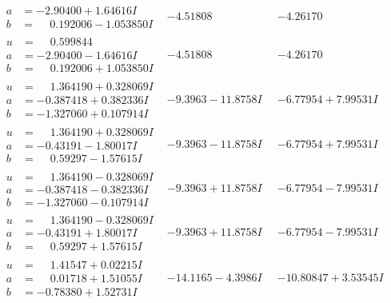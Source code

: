 \documentclass[1p]{elsarticle_modified}
\theoremstyle{definition}
\begin{document}
$$\begin{array}{c|c|c}
\begin{aligned}
a &= -2.90400 + 1.64616 I \\
b &= \phantom{-}0.192006 - 1.053850 I\end{aligned}
 & -4.51808\phantom{ +0.000000I} & -4.26170\phantom{ +0.000000I} \\ \hline\begin{aligned}
u &= \phantom{-}0.599844\phantom{ +0.000000I} \\
a &= -2.90400 - 1.64616 I \\
b &= \phantom{-}0.192006 + 1.053850 I\end{aligned}
 & -4.51808\phantom{ +0.000000I} & -4.26170\phantom{ +0.000000I} \\ \hline\begin{aligned}
u &= \phantom{-}1.364190 + 0.328069 I \\
a &= -0.387418 + 0.382336 I \\
b &= -1.327060 + 0.107914 I\end{aligned}
 & -9.3963 - 11.8758 I & -6.77954 + 7.99531 I \\ \hline\begin{aligned}
u &= \phantom{-}1.364190 + 0.328069 I \\
a &= -0.43191 - 1.80017 I \\
b &= \phantom{-}0.59297 - 1.57615 I\end{aligned}
 & -9.3963 - 11.8758 I & -6.77954 + 7.99531 I \\ \hline\begin{aligned}
u &= \phantom{-}1.364190 - 0.328069 I \\
a &= -0.387418 - 0.382336 I \\
b &= -1.327060 - 0.107914 I\end{aligned}
 & -9.3963 + 11.8758 I & -6.77954 - 7.99531 I \\ \hline\begin{aligned}
u &= \phantom{-}1.364190 - 0.328069 I \\
a &= -0.43191 + 1.80017 I \\
b &= \phantom{-}0.59297 + 1.57615 I\end{aligned}
 & -9.3963 + 11.8758 I & -6.77954 - 7.99531 I \\ \hline\begin{aligned}
u &= \phantom{-}1.41547 + 0.02215 I \\
a &= \phantom{-}0.01718 + 1.51055 I \\
b &= -0.78380 + 1.52731 I\end{aligned}
 & -14.1165 - 4.3986 I & -10.80847 + 3.53545 I \\ \hline\begin{aligned}

\end{aligned}
\end{array}$$
\end{document}
